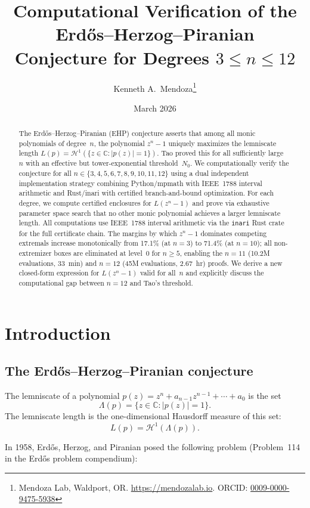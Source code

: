 \documentclass[11pt]{article}
\title{Computational Verification of the Erd\H{o}s--Herzog--Piranian\\Conjecture for Degrees $3 \leq n \leq 12$}
\author{Kenneth A.\ Mendoza\thanks{Mendoza Lab, Waldport, OR. \url{https://mendozalab.io}. ORCID: \href{https://orcid.org/0009-0000-9475-5938}{0009-0000-9475-5938}}}
\date{March 2026}
\theoremstyle{plain}
\theoremstyle{definition}
\theoremstyle{remark}
\begin{document}
\maketitle

\begin{abstract}
The Erd\H{o}s--Herzog--Piranian (EHP) conjecture asserts that among all monic polynomials of degree~$n$, the polynomial $z^n - 1$ uniquely maximizes the lemniscate length $L(p) = \mathcal{H}^1(\{z \in \mathbb{C} : |p(z)| = 1\})$. Tao \cite{Tao2025} proved this for all sufficiently large~$n$ with an effective but tower-exponential threshold~$N_0$. We computationally verify the conjecture for all $n \in \{3, 4, 5, 6, 7, 8, 9, 10, 11, 12\}$ using a dual independent implementation strategy combining Python/mpmath with IEEE~1788 interval arithmetic and Rust/inari with certified branch-and-bound optimization. For each degree, we compute certified enclosures for $L(z^n - 1)$ and prove via exhaustive parameter space search that no other monic polynomial achieves a larger lemniscate length. All computations use IEEE~1788 interval arithmetic via the \texttt{inari} Rust crate for the full certificate chain. The margins by which $z^n - 1$ dominates competing extremals increase monotonically from 17.1\% (at $n=3$) to 71.4\% (at $n=10$); all non-extremizer boxes are eliminated at level~0 for $n \geq 5$, enabling the $n = 11$ (10.2M evaluations, 33~min) and $n = 12$ (45M evaluations, 2.67~hr) proofs. We derive a new closed-form expression for $L(z^n - 1)$ valid for all~$n$ and explicitly discuss the computational gap between $n = 12$ and Tao's threshold.
\end{abstract}

\section{Introduction}

\subsection{The Erd\H{o}s--Herzog--Piranian conjecture}

The lemniscate of a polynomial $p(z) = z^n + a_{n-1}z^{n-1} + \cdots + a_0$ is the set
\[
\Lambda(p) = \{z \in \mathbb{C} : |p(z)| = 1\}.
\]
The lemniscate length is the one-dimensional Hausdorff measure of this set:
\[
L(p) = \mathcal{H}^1(\Lambda(p)).
\]

In 1958, Erd\H{o}s, Herzog, and Piranian \cite{EHP1958} posed the following problem (Problem~114 in the Erd\H{o}s problem compendium):
\end{document}
